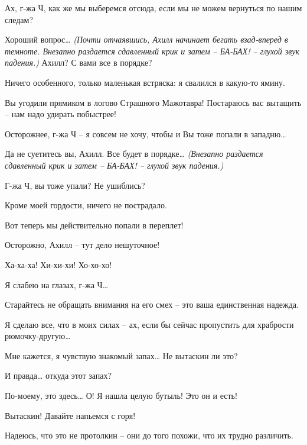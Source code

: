 \documentclass[../main.tex]{subfiles}
\begin{document}
\begin{Dialogue}
\begin{sublevel}
\begin{sublevel}
\begin{sublevel}
 Ах, г-жа Ч, как же мы выберемся отсюда, если мы не можем вернуться по нашим следам?

 Хороший вопрос\ldots{} \emph{(Почти отчаявшись, Ахилл начинает бегать взад-вперед в темноте. Внезапно раздается сдавленный крик и затем \--- БА-БАХ! \--- глухой звук падения.)} Ахилл? С вами все в порядке?

 Ничего особенного, только маленькая встряска: я свалился в какую-то ямину.

 Вы угодили прямиком в логово Страшного Мажотавра! Постараюсь вас вытащить \--- нам надо удирать побыстрее!

 Осторожнее, г-жа Ч \--- я совсем не хочу, чтобы и Вы тоже попали в западню\ldots{}

 Да не суетитесь вы, Ахилл. Все будет в порядке\ldots{} \emph{(Внезапно раздается сдавленный крик и затем \--- БА-БАХ! \--- глухой звук падения.)}

 Г-жа Ч, вы тоже упали? Не ушиблись?

 Кроме моей гордости, ничего не пострадало.

 Вот теперь мы действительно попали в переплет!


 Осторожно, Ахилл \--- тут дело нешуточное!

 Ха-ха-ха! Хи-хи-хи! Хо-хо-хо!

 Я слабею на глазах, г-жа Ч\ldots{}

 Старайтесь не обращать внимания на его смех \--- это ваша единственная надежда.

 Я сделаю все, что в моих силах \--- ах, если бы сейчас пропустить для храбрости рюмочку-другую\ldots{}

 Мне кажется, я чувствую знакомый запах\ldots{} Не вытаскин ли это?

 И правда\ldots{} откуда этот запах?

 По-моему, это здесь\ldots{} О! Я нашла целую бутыль! Это он и есть!

 Вытаскин! Давайте напьемся с горя!


\begin{customlevel}{0}
     Надеюсь, что это не протолкин \--- они до того похожи, что их трудно различить.
\end{customlevel}


\end{sublevel}
\end{sublevel}
\end{sublevel}
\end{Dialogue}
\end{document}
